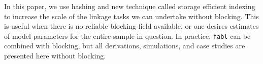 \documentclass[ba]{imsart}
\begin{document}
In this paper, we use hashing and new technique called storage efficient indexing to increase the scale of the linkage tasks we can undertake without blocking. This is useful when there is no reliable blocking field available, or one desires estimates of model parameters for the entire sample in question. In practice, \texttt{fabl} can be combined with blocking, but all derivations, simulations, and case studies are presented here without blocking. 	











%
\end{document}
